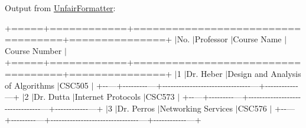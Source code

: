 Output from \hyperlink{classUnfairFormatter}{Unfair\+Formatter}\+:

+=====+============+===================================+===============+ $\vert$\+No. $\vert$\+Professor $\vert$\+Course Name $\vert$\+Course Number $\vert$ +=====+============+===================================+===============+ $\vert$1 $\vert$\+Dr. Heber $\vert$\+Design and Analysis of Algorithms $\vert$\+C\+S\+C505 $\vert$ +-\/-\/---+-\/-\/-\/-\/-\/-\/-\/-\/-\/---+-\/-\/-\/-\/-\/-\/-\/-\/-\/-\/-\/-\/-\/-\/-\/-\/-\/-\/-\/-\/-\/-\/-\/-\/-\/-\/-\/-\/-\/-\/-\/-\/---+-\/-\/-\/-\/-\/-\/-\/-\/-\/-\/-\/-\/---+ $\vert$2 $\vert$\+Dr. Dutta $\vert$\+Internet Protocols $\vert$\+C\+S\+C573 $\vert$ +-\/-\/---+-\/-\/-\/-\/-\/-\/-\/-\/-\/---+-\/-\/-\/-\/-\/-\/-\/-\/-\/-\/-\/-\/-\/-\/-\/-\/-\/-\/-\/-\/-\/-\/-\/-\/-\/-\/-\/-\/-\/-\/-\/-\/---+-\/-\/-\/-\/-\/-\/-\/-\/-\/-\/-\/-\/---+ $\vert$3 $\vert$\+Dr. Perros $\vert$\+Networking Services $\vert$\+C\+S\+C576 $\vert$ +-\/-\/---+-\/-\/-\/-\/-\/-\/-\/-\/-\/---+-\/-\/-\/-\/-\/-\/-\/-\/-\/-\/-\/-\/-\/-\/-\/-\/-\/-\/-\/-\/-\/-\/-\/-\/-\/-\/-\/-\/-\/-\/-\/-\/---+-\/-\/-\/-\/-\/-\/-\/-\/-\/-\/-\/-\/---+ 